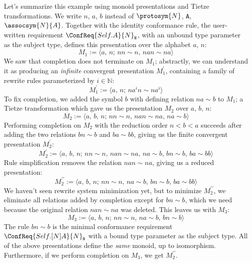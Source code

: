 \documentclass[../generics]{subfiles}
\begin{document}
\begin{example}
Let's summarize this example using monoid presentations and Tietze transformations. We write $n$, $a$, $b$ instead of $\protosym{N}$, \texttt{A}, $\assocsym{N}{A}$. Together with the identity conformance rule, the user-written requirement $\ConfReq{Self.A}{N}_\texttt{N}$, with an unbound type parameter as the subject type, defines this presentation over the alphabet $a$, $n$:
\[M_1 := \langle a,\,n;\,nn\sim n,\,nan\sim na\rangle\]
We saw that completion does not terminate on $M_1$; abstractly, we can understand it as producing an \emph{infinite} convergent presentation $M_1^\prime$, containing a family of rewrite rules parameterized by $i\in\mathbb{N}$:
\[M_1^\prime := \langle a,\,n;\,na^in\sim na^i\rangle\]
To fix completion, we added the symbol $b$ with defining relation $na\sim b$ to $M_1$; a Tietze transformation which gave us the presentation $M_2$ over $a$, $b$, $n$:
\[M_2 := \langle a,\,b,\,n;\,nn\sim n,\,nan\sim na,\,na\sim b\rangle\]
Performing completion on $M_2$ with the reduction order $n<b<a$ succeeds after adding the two relations $bn\sim b$ and $ba\sim bb$, giving us the finite convergent presentation $M_2^\prime$:
\[M_2^\prime := \langle a,\,b,\,n;\,nn\sim n,\,nan\sim na,\,na\sim b,\,bn\sim b,\,ba\sim bb\rangle\]
Rule simplification removes the relation $nan\sim na$, giving us a reduced presentation:
\[M_2^{\prime\prime} := \langle a,\,b,\,n;\,nn\sim n,\,na\sim b,\,bn\sim b,\,ba\sim bb\rangle\]
We haven't seen rewrite system minimization yet, but to minimize $M_2^{\prime\prime}$, we eliminate all relations added by completion except for $bn\sim b$, which we need because the original relation $nan\sim na$ was deleted. This leaves us with $M_3$:
\[M_3:=\langle a,\,b,\,n;\,nn\sim n,\,na\sim b,\,bn\sim b\rangle\]
The rule $bn\sim b$ is the minimal conformance requirement $\ConfReq{Self.[N]A}{N}_\texttt{N}$ with a bound type parameter as the subject type. All of the above presentations define the \emph{same} monoid, up to isomorphism. Furthermore, if we perform completion on $M_3$, we get $M_2^{\prime\prime}$.
\end{example}
\end{document}
